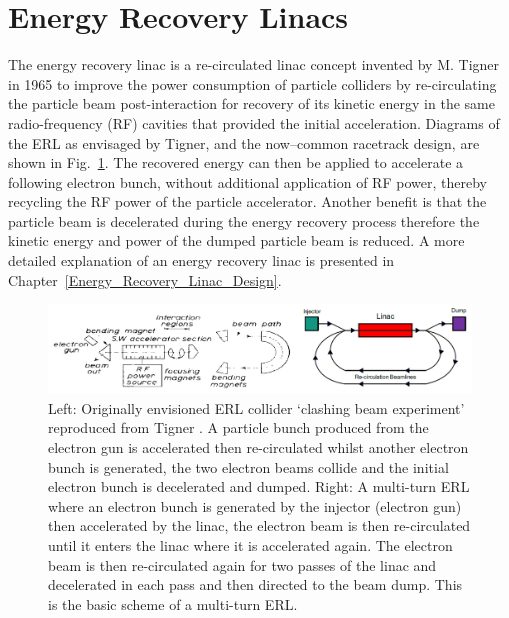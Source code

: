\documentclass[../main.tex]{subfiles}
\begin{document}
\section{Energy Recovery Linacs}

The energy recovery linac is a re-circulated linac concept invented by M. Tigner in 1965 \cite{tigner1965possible} to improve the power consumption of particle colliders by re-circulating the particle beam post-interaction for recovery of its kinetic energy in the same radio-frequency (RF) cavities that provided the initial acceleration. Diagrams of the ERL as envisaged by Tigner, and the now--common racetrack design, are shown in Fig.~\ref{fig:tigner_modern_ERL}. The recovered energy can then be applied to accelerate a following electron bunch, without additional application of RF power, thereby recycling the RF power of the particle accelerator. Another benefit is that the particle beam is decelerated during the energy recovery process therefore the kinetic energy and power of the dumped particle beam is reduced. A more detailed explanation of an energy recovery linac is presented in Chapter~\ref{Energy_Recovery_Linac_Design}.
\begin{figure}[!h]
\centering
\includegraphics[width=\textwidth]{Figures/Introduction/Tigner_Modern_ERL.pdf}
\caption{Left: Originally envisioned ERL collider `clashing beam experiment' reproduced from Tigner \cite{tigner1965possible}. A  particle bunch produced from the electron gun is accelerated then re-circulated whilst another electron bunch is generated, the two electron beams collide and the initial electron bunch is decelerated and dumped. Right: A multi-turn ERL where an electron bunch is generated by the injector (electron gun) then accelerated by the linac, the electron beam is then re-circulated until it enters the linac where it is accelerated again. The electron beam is then re-circulated again for two passes of the linac and decelerated in each pass and then directed to the beam dump. This is the basic scheme of a multi-turn ERL.}
\label{fig:tigner_modern_ERL}
\end{figure}
\end{document}
